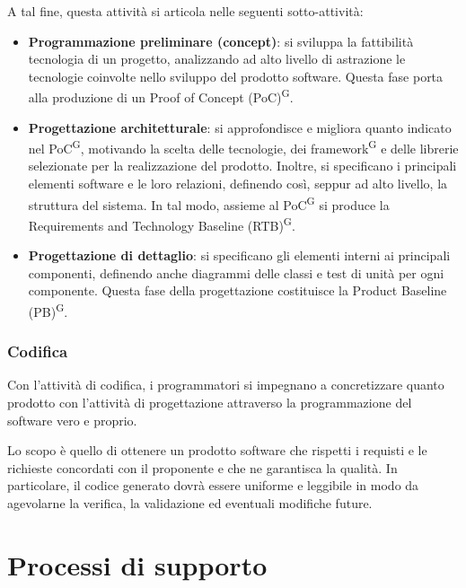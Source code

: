A tal fine, questa attività si articola nelle seguenti sotto-attività:
\begin{itemize}
    \item \textbf{Programmazione preliminare (concept)}: si sviluppa la fattibilità tecnologia di un progetto, analizzando ad alto livello di astrazione le tecnologie coinvolte nello sviluppo del prodotto software. Questa fase porta alla produzione di un Proof of Concept (PoC)\textsuperscript{G}.
    \item \textbf{Progettazione architetturale}: si approfondisce e migliora quanto indicato nel PoC\textsuperscript{G}, motivando la scelta delle tecnologie, dei framework\textsuperscript{G} e delle librerie selezionate per la realizzazione del prodotto. Inoltre, si specificano i principali elementi software e le loro relazioni, definendo così, seppur ad alto livello, la struttura del sistema. In tal modo, assieme al PoC\textsuperscript{G} si produce la Requirements and Technology Baseline (RTB)\textsuperscript{G}.
    \item \textbf{Progettazione di dettaglio}: si specificano gli elementi interni ai principali componenti, definendo anche diagrammi delle classi e test di
    unità per ogni componente. Questa fase della progettazione costituisce la Product Baseline (PB)\textsuperscript{G}.
\end{itemize}

\subsubsection{Codifica} 
Con l'attività di codifica, i programmatori si impegnano a concretizzare quanto prodotto con l'attività di progettazione attraverso la programmazione del software vero e proprio.

Lo scopo è quello di ottenere un prodotto software che rispetti i requisti e le richieste concordati con il proponente e che ne garantisca la qualità. In particolare, il codice generato dovrà essere uniforme e leggibile in modo da agevolarne la verifica, la validazione ed eventuali modifiche future.


\newpage
\section{Processi di supporto}\label{sec:processi_di_supporto}

